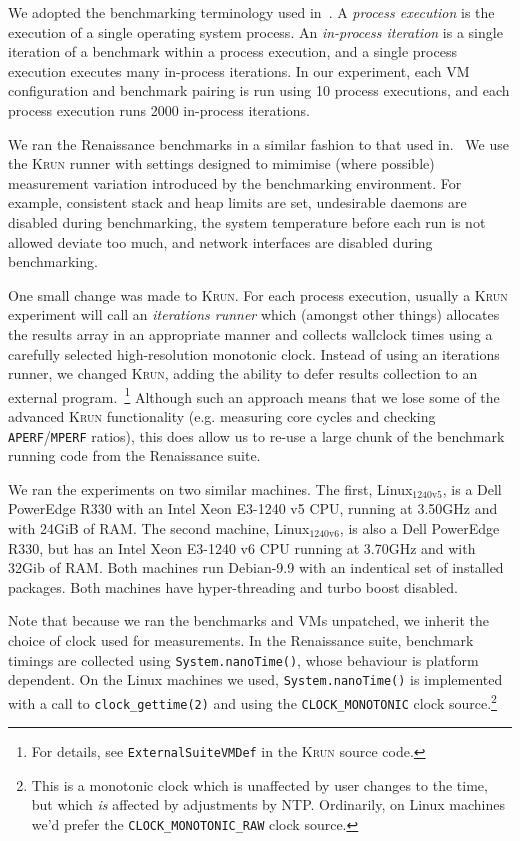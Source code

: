 \documentclass[a4paper]{article}
\newcommand{\krun}{\textsc{Krun}\xspace}
\newcommand{\bencherseven}{Linux$_\mathrm{1240v5}$\xspace}
\newcommand{\bencherten}{Linux$_\mathrm{1240v6}$\xspace}
\begin{document}
We adopted the benchmarking terminology used in~\cite{barrett16warmup}. A
\emph{process execution} is the execution of a single operating system process.
An \emph{in-process iteration} is a single iteration of a benchmark within a
process execution, and a single process execution executes many in-process
iterations. In our experiment, each VM configuration and benchmark pairing is
run using 10 process executions, and each process execution runs 2000
in-process iterations.

We ran the Renaissance benchmarks in a similar fashion to that used
in.~\cite{barrett16warmup} We use the \krun runner with
settings designed to mimimise (where possible) measurement variation introduced
by the benchmarking environment. For example, consistent stack and heap limits
are set, undesirable daemons are disabled during benchmarking, the system
temperature before each run is not allowed deviate too much, and network
interfaces are disabled during benchmarking.

One small change was made to \krun. For each process execution, usually a
\krun experiment will call an \emph{iterations runner} which (amongst other
things) allocates the results array in an appropriate manner and collects
wallclock times using a carefully selected high-resolution monotonic clock. Instead
of using an iterations runner, we changed \krun, adding the ability to defer
results collection to an external program.~\footnote{For details, see
\texttt{ExternalSuiteVMDef} in the \krun source code.} Although such an approach
means that we lose some of the advanced \krun functionality (e.g.
measuring core cycles and checking \texttt{APERF}/\texttt{MPERF} ratios), this
does allow us to re-use a large chunk of the benchmark running code from the
Renaissance suite.

We ran the experiments on two similar machines. The first, \bencherseven, is a
Dell PowerEdge R330 with an Intel Xeon E3-1240 v5 CPU, running at 3.50GHz and
with 24GiB of RAM. The second machine, \bencherten, is also a Dell PowerEdge
R330, but has an Intel Xeon E3-1240 v6 CPU running at 3.70GHz
and with 32Gib of RAM. Both machines run Debian-9.9 with an indentical set of
installed packages. Both machines have hyper-threading and turbo boost
disabled.

Note that because we ran the benchmarks and VMs unpatched, we inherit the
choice of clock used for measurements. In the Renaissance suite, benchmark
timings are collected using \texttt{System.nanoTime()}, whose behaviour is
platform dependent. On the Linux machines we used, \texttt{System.nanoTime()}
is implemented with a call to \texttt{clock\_gettime(2)} and using the
\texttt{CLOCK\_MONOTONIC} clock source.\footnote{This is a monotonic clock which
is unaffected by user changes to the time, but which \emph{is} affected by
adjustments by NTP. Ordinarily, on Linux machines we'd prefer the
\texttt{CLOCK\_MONOTONIC\_RAW} clock source.}
\end{document}
